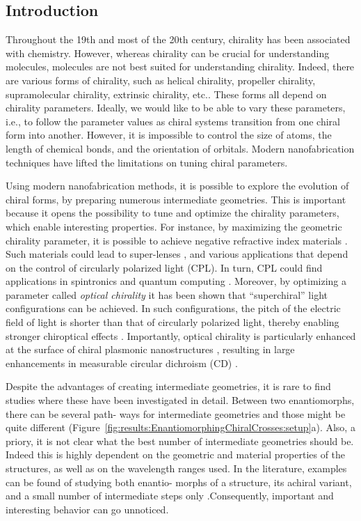 \subsection{Introduction}\label{sec:results:EnantiomorphingChiralCrosses:introduction}
Throughout the 19th and most of the 20th century, chirality has been associated with chemistry. However, whereas chirality can be crucial for understanding molecules, molecules are not best suited for understanding chirality. Indeed, there are various forms of chirality, such as helical chirality, propeller chirality, supramolecular chirality, extrinsic chirality, etc.\cite{Collins2017, Valev2013b}. These forms all depend on chirality parameters. 
Ideally, we would like to be able to vary these parameters, i.e., to follow the parameter values as chiral systems transition from one chiral form into another. However, it is impossible to control the size of atoms, the length of chemical bonds, and the orientation of orbitals. Modern nanofabrication techniques have lifted the limitations on tuning chiral parameters.

Using modern nanofabrication methods, it is possible to explore the evolution of chiral forms, by preparing numerous intermediate geometries. This is important because it opens the possibility to tune and optimize the chirality parameters, which enable interesting properties. For instance, by maximizing the geometric chirality parameter, it is possible to achieve negative refractive index materials \cite{Pendry2004a}. Such materials could lead to super-lenses \cite{Khorasaninejad2016}, and various applications that depend on the control of circularly polarized light (CPL). In turn, CPL could find applications in spintronics \cite{Farshchi2011b} and quantum computing \cite{Wagenknecht2010a, Sherson2006a}.
Moreover, by optimizing a parameter called \textit{optical chirality} \cite{Tang2010} it has been shown that “superchiral” light configurations can be achieved. In such configurations, the pitch of the electric field of light is shorter than that of circularly polarized light, thereby enabling stronger chiroptical effects \cite{Hendry2010, Hendry2012, Tullius2015}. Importantly, optical chirality is particularly enhanced at the surface of chiral plasmonic nanostructures \cite{Schaferling2012, Karimullah2015}, resulting in large enhancements in measurable circular dichroism (CD) \cite{Maoz2013, Wang2014c, Ma2013b, Zhang2013}.

Despite the advantages of creating intermediate geometries, it is rare to find studies where these have been investigated in detail. Between two enantiomorphs, there can be several path- ways for intermediate geometries and those might be quite different (Figure~\ref{fig:results:EnantiomorphingChiralCrosses:setup}a). 
Also, a priory, it is not clear what the best number of intermediate geometries should be. Indeed this is highly dependent on the geometric and material properties of the structures, as well as on the wavelength ranges used. In the literature, examples can be found of studying both enantio- morphs of a structure, its achiral variant, and a small number of intermediate steps only \cite{Zu2016}.Consequently, important and interesting behavior can go unnoticed.

